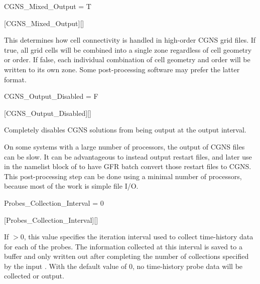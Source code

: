 
\begin{nmldescitem}
CGNS_Mixed_Output = T
\end{nmldescitem}
[CGNS\_Mixed\_Output][]

\begin{nmldescbody}
This determines how cell connectivity is handled in high-order CGNS grid files.
%
If true, all grid cells will be combined into a single zone
regardless of cell geometry or order.
%
If false, each individual combination of cell geometry and order
will be written to its own zone.
%
Some post-processing software may prefer the latter format.
\end{nmldescbody}


\begin{nmldescitem}
CGNS_Output_Disabled = F
\end{nmldescitem}
[CGNS\_Output\_Disabled][]

\begin{nmldescbody}
Completely disables CGNS solutions from being output at the output interval.

On some systems with a large number of processors,
the output of CGNS files can be slow.
%
It can be advantageous to instead output restart files,
and later use
in the  namelist block of 
to have GFR batch convert those restart files to CGNS.
%
This post-processing step can be done using a minimal number
of processors, because most of the work is simple file I\slash O.

\end{nmldescbody}


\begin{nmldescitem}
Probes_Collection_Interval = 0
\end{nmldescitem}
[Probes\_Collection\_Interval][]

\begin{nmldescbody}
If $>0$, this value specifies the iteration interval used to collect
time-history data for each of the probes. The information collected at this
interval is saved to a buffer and only written out after completing the number
of collections specified by the input
.
%
With the default value of 0, no time-history probe data will be collected or
output.
\end{nmldescbody}

